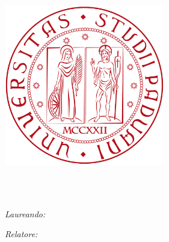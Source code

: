\begin{titlepage}
	\begin{addmargin}[-1cm]{-3cm}
    \begin{center}
        \large  

        \hfill

        \vfill

        \begingroup
        	\textcolor{redUni}{\textls[160]{\scshape{\huge \myUni}}}\\ \bigskip
        	
        	\textls[80]{\scshape{\LARGE \myDepartment}}\\ \medskip
        	
			\textls[80]{\scshape{\Large \myDegree}}\\
            
        \endgroup

        \vfill

        \includegraphics[width=7cm]{gfx/unipd_sigillo} \\ \medskip
		
		\vfill		
		
		\textcolor{redUni}{\textls[80]{\scshape{\LARGE \myTitle}}} \\ \medskip
        \mySubtitle \\
        
        \vfill
        
        
		\begin{minipage}{0.5\textwidth}
			\begin{flushleft}
			\emph{Laureando:}\\
			\textsc{\large \myName}
			\end{flushleft}
		\end{minipage}
		\begin{minipage}{0.5\textwidth}
			\begin{flushright}
			\emph{Relatore:}\\
			\textsc{\large \myProf}
			\end{flushright}
		\end{minipage}        
        

\end{center}
\end{addmargin}
\end{titlepage}
